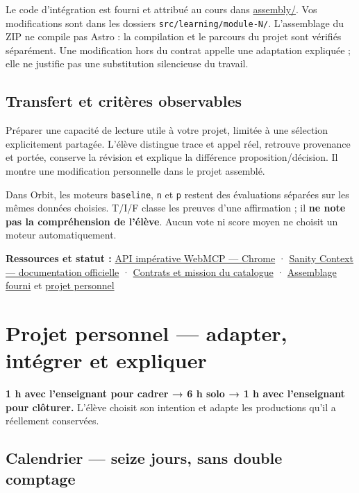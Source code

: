 \documentclass[
  canadien,
  11pt,
  a4paper,
]{report}
\begin{document}
Le code d'intégration est fourni et attribué au cours dans
\href{../../assembly/README.md}{assembly/}. Vos modifications sont dans
les dossiers \texttt{src/\allowbreak{}learning/\allowbreak{}module-N/\allowbreak{}}. L'assemblage du ZIP ne
compile pas Astro : la compilation et le parcours du projet sont
vérifiés séparément. Une modification hors du contrat appelle une
adaptation expliquée ; elle ne justifie pas une substitution silencieuse
du travail.

\section{Transfert et critères
observables}\label{transfert-et-crituxe8res-observables-7}

Préparer une capacité de lecture utile à votre projet, limitée à une
sélection explicitement partagée. L'élève distingue trace et appel réel,
retrouve provenance et portée, conserve la révision et explique la
différence proposition/décision. Il montre une modification personnelle
dans le projet assemblé.

Dans Orbit, les moteurs \texttt{baseline}, \texttt{n} et \texttt{p}
restent des évaluations séparées sur les mêmes données choisies. T/I/F
classe les preuves d'une affirmation ; il \textbf{ne note pas la
compréhension de l'élève}. Aucun vote ni score moyen ne choisit un
moteur automatiquement.

\textbf{Ressources et statut :}
\href{https://developer.chrome.com/docs/ai/webmcp/imperative-api}{API
impérative WebMCP --- Chrome} ·
\href{https://www.sanity.io/docs/ai/sanity-context}{Sanity Context ---
documentation officielle} ·
\href{../../../../../packages/learning/src/catalog.ts}{Contrats et
mission du catalogue} · \href{../../assembly/README.md}{Assemblage
fourni} et \href{../../PROJECT.md}{projet personnel}

\chapter{Projet personnel --- adapter, intégrer et
expliquer}\label{projet-personnel-adapter-intuxe9grer-et-expliquer}

\textbf{1 h avec l'enseignant pour cadrer → 6 h solo → 1 h avec
l'enseignant pour clôturer.} L'élève choisit son intention et adapte les
productions qu'il a réellement conservées.

\section{Calendrier --- seize jours, sans double
comptage}\label{calendrier-seize-jours-sans-double-comptage}
\end{document}
